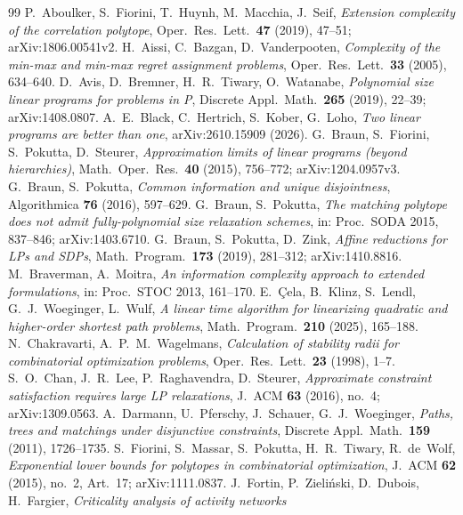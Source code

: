 \documentclass[11pt]{amsart}
\theoremstyle{plain}
\theoremstyle{definition}
\theoremstyle{remark}
\begin{document}
\begin{thebibliography}{99}
 P.~Aboulker, S.~Fiorini, T.~Huynh, M.~Macchia, J.~Seif, \emph{Extension complexity of the correlation
  polytope}, Oper.\ Res.\ Lett.\ \textbf{47} (2019), 47--51; arXiv:1806.00541v2.
 H.~Aissi, C.~Bazgan, D.~Vanderpooten, \emph{Complexity of the min-max and min-max regret assignment
  problems}, Oper.\ Res.\ Lett.\ \textbf{33} (2005), 634--640.
 D.~Avis, D.~Bremner, H.~R.~Tiwary, O.~Watanabe, \emph{Polynomial size linear programs for problems in
  P}, Discrete Appl.\ Math.\ \textbf{265} (2019), 22--39; arXiv:1408.0807.
 A.~E.~Black, C.~Hertrich, S.~Kober, G.~Loho, \emph{Two linear programs are better than one},
  arXiv:2610.15909 (2026).
 G.~Braun, S.~Fiorini, S.~Pokutta, D.~Steurer, \emph{Approximation limits of linear programs (beyond
  hierarchies)}, Math.\ Oper.\ Res.\ \textbf{40} (2015), 756--772; arXiv:1204.0957v3.
 G.~Braun, S.~Pokutta, \emph{Common information and unique disjointness}, Algorithmica \textbf{76}
  (2016), 597--629.
 G.~Braun, S.~Pokutta, \emph{The matching polytope does not admit fully-polynomial size
  relaxation schemes}, in: Proc.\ SODA 2015, 837--846; arXiv:1403.6710.
 G.~Braun, S.~Pokutta, D.~Zink, \emph{Affine reductions for LPs and SDPs}, Math.\ Program.\
  \textbf{173} (2019), 281--312; arXiv:1410.8816.
 M.~Braverman, A.~Moitra, \emph{An information complexity approach to extended formulations}, in:
  Proc.\ STOC 2013, 161--170.
 E.~\c{C}ela, B.~Klinz, S.~Lendl, G.~J.~Woeginger, L.~Wulf, \emph{A linear time algorithm for
  linearizing quadratic and higher-order shortest path problems}, Math.\ Program.\ \textbf{210} (2025), 165--188.
\bibitem{CW} N.~Chakravarti, A.~P.~M.~Wagelmans, \emph{Calculation of stability radii for combinatorial optimization
  problems}, Oper.\ Res.\ Lett.\ \textbf{23} (1998), 1--7.
 S.~O.~Chan, J.~R.~Lee, P.~Raghavendra, D.~Steurer, \emph{Approximate constraint satisfaction requires
  large LP relaxations}, J.\ ACM \textbf{63} (2016), no.~4; arXiv:1309.0563.
\bibitem{DPSW} A.~Darmann, U.~Pferschy, J.~Schauer, G.~J.~Woeginger, \emph{Paths, trees and matchings under
  disjunctive constraints}, Discrete Appl.\ Math.\ \textbf{159} (2011), 1726--1735.
\bibitem{FMPTW} S.~Fiorini, S.~Massar, S.~Pokutta, H.~R.~Tiwary, R.~de~Wolf, \emph{Exponential lower bounds for
  polytopes in combinatorial optimization}, J.\ ACM \textbf{62} (2015), no.~2, Art.~17; arXiv:1111.0837.
\bibitem{Fortin} J.~Fortin, P.~Zieli\'nski, D.~Dubois, H.~Fargier, \emph{Criticality analysis of activity networks
}
\end{thebibliography}
\end{document}
